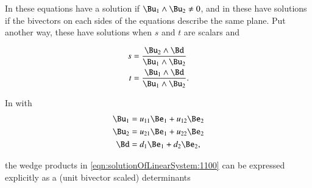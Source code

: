 In  these equations have a solution if \( \Bu_1 \wedge \Bu_2 \ne 0 \), and in  these have solutions if the bivectors on each sides of the equations describe the same plane.
Put another way, these have solutions when \( s \) and \( t \) are scalars and

\begin{dmath}\label{eqn:solutionOfLinearSystem:1100}
\begin{aligned}
s &= \frac{\Bu_2 \wedge \Bd}{\Bu_1 \wedge \Bu_2} \\
t &= \frac{\Bu_1 \wedge \Bd}{\Bu_1 \wedge \Bu_2}.
\end{aligned}
\end{dmath}

In
with
\begin{dmath}\label{eqn:solutionOfLinearSystem:1120}
\begin{aligned}
\Bu_1 &= u_{11} \Be_1 + u_{12} \Be_2 \\
\Bu_2 &= u_{21} \Be_1 + u_{22} \Be_2 \\
\Bd &= d_{1} \Be_1 + d_{2} \Be_2,
\end{aligned}
\end{dmath}

the wedge products in \cref{eqn:solutionOfLinearSystem:1100}
can be expressed explicitly as a (unit bivector scaled) determinants

